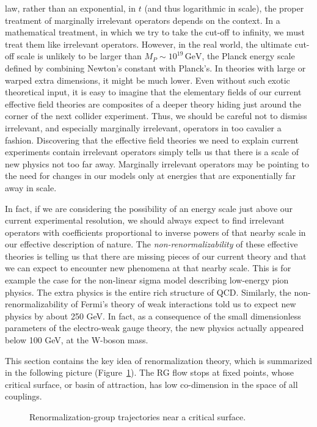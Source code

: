 law, rather than an exponential, in $t$ (and thus logarithmic in scale), the
proper treatment of marginally irrelevant operators depends on the context.
In a mathematical treatment, in which we try to take the cut-off to infinity,
we must treat them like irrelevant operators. However, in the real world, the
ultimate cut-off scale is unlikely to be larger than
$M_P\sim10^{19}\,\mathrm{GeV}$, the Planck energy scale defined by combining
Newton's constant with Planck's. In theories with large or warped extra
dimensions, it might be much lower. Even without such exotic theoretical
input, it is easy to imagine that the elementary fields of our current
effective field theories are composites of a deeper theory hiding just around
the corner of the next collider experiment. Thus, we should be careful not to
dismiss irrelevant, and especially marginally irrelevant, operators in too
cavalier a fashion. Discovering that the effective field theories we need to
explain current experiments contain irrelevant operators simply tells us that
there is a scale of new physics not too far away. Marginally irrelevant
operators may be pointing to the need for changes in our models only at
energies that are exponentially far away in scale.

In fact, if we are considering the possibility of an energy scale just above
our current experimental resolution, we should always expect to find
irrelevant operators with coefficients proportional to inverse powers of that
nearby scale in our effective description of nature. The
\emph{non-renormalizability} of these effective theories is telling us that
there are missing pieces of our current theory and that we can expect to
encounter new phenomena at that nearby scale. This is for example the case for
the non-linear sigma model describing low-energy pion physics. The extra
physics is the entire rich structure of QCD. Similarly, the
non-renormalizability of Fermi's theory of weak interactions told us to expect
new physics by about 250 GeV. In fact, as a consequence of the small
dimensionless parameters of the electro-weak gauge theory, the new physics
actually appeared below 100 GeV, at the W-boson mass.

This section contains the key idea of renormalization theory, which is
summarized in the following picture (Figure~\ref{fig:9.3}). The RG flow stops
at fixed points, whose critical surface, or basin of attraction, has low
co-dimension in the space of all couplings.

\begin{figure}[htbp]
  \centering
  
  \caption{Renormalization-group trajectories near a critical surface.}
  \label{fig:9.3}
\end{figure}

